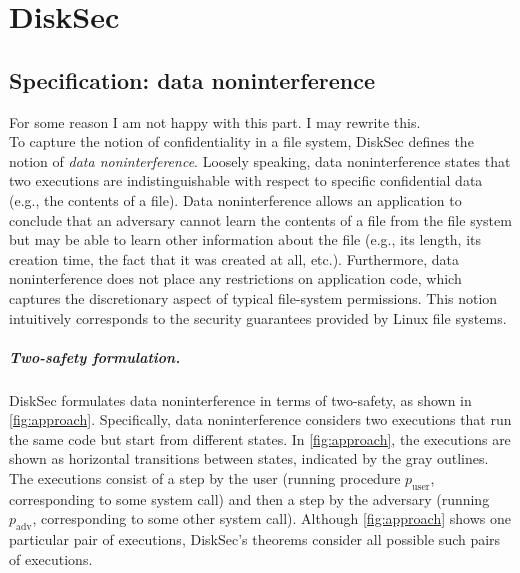 \chapter{DiskSec}
\label{chapter:Disksec}

\section{Specification: data noninterference}
\label{s:spec}

{\color{red} For some reason I am not happy with this part. I may rewrite this. }\\
To capture the notion of confidentiality in a file system, DiskSec
defines the notion of \emph{data noninterference}.  Loosely speaking,
data noninterference states that two executions are indistinguishable
with respect to specific confidential data (e.g., the contents of
a file).  Data noninterference allows an application to conclude that
an adversary cannot learn the contents of a file from the file system
but may be able to learn other information about the file (e.g., its
length, its creation time, the fact that it was created at all, etc.).
Furthermore, data noninterference does not place any restrictions on
application code, which captures the discretionary aspect of typical
file-system permissions.  This notion intuitively corresponds to the
security guarantees provided by Linux file systems.

%    

\paragraph{Two-safety formulation.}
DiskSec formulates data noninterference in terms of two-safety, as shown
in \ref{fig:approach}.  Specifically, data noninterference considers
two executions that run the same code but start from different states.  In
\ref{fig:approach}, the executions are shown as horizontal transitions
between states, indicated by the gray outlines.  The executions
consist of a step by the user (running procedure $p_\mathrm{user}$,
corresponding to some system call) and then a step by the adversary
(running $p_\mathrm{adv}$, corresponding to some other system call).
Although \ref{fig:approach} shows one particular pair of executions,
DiskSec's theorems consider all possible such pairs of executions.

